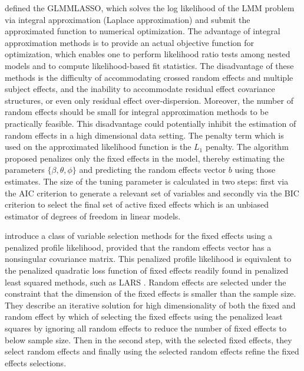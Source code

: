 \documentclass{article}
\begin{document}
\cite{SchelldorferBuhlmann2011} defined the GLMMLASSO, which solves the log likelihood of the LMM problem via integral approximation (Laplace approximation) and submit the approximated function to numerical optimization. The advantage of integral approximation methods is to provide an actual objective function for optimization, which enables one to perform likelihood ratio tests among nested models and to compute likelihood-based fit statistics. The disadvantage of these methods is the difficulty of accommodating crossed random effects and multiple subject effects, and the inability to accommodate residual effect covariance structures, or even only residual effect over-dispersion. Moreover, the number of random effects should be small for integral approximation methods to be practically feasible. This disadvantage could potentially inhibit the estimation of random effects in a high dimensional data setting. The penalty term which is used on the approximated likelihood function is the $L_1$ penalty. The algorithm proposed penalizes only the fixed effects in the model, thereby estimating the parameters $\lbrace\beta,\theta,\phi\rbrace$ and predicting the random effects vector $b$ using those estimates. The size of the tuning parameter is calculated  in two steps: first via the AIC criterion to generate a relevant set of variables and secondly via the BIC criterion to select the final set of active fixed effects which is an unbiased estimator of degrees of freedom in linear models.

\cite{fan2012variable} introduce a class of variable selection methods for the fixed effects using a penalized profile likelihood, provided that the random effects vector has a nonsingular covariance matrix. This penalized profile likelihood is equivalent to the penalized quadratic loss function of fixed effects readily found in penalized least squared methods, such as LARS \cite{efron2004least}. Random effects are selected under the constraint that the dimension of the fixed effects is smaller than the sample size. They describe an iterative solution for high dimensionality of both the fixed and random effect by which of selecting the fixed effects using the penalized least squares by ignoring all random effects to reduce the number of fixed effects to below sample size. Then in the second step, with the selected fixed effects, they select random effects and finally using the selected random effects refine the fixed effects selections.
\end{document}
